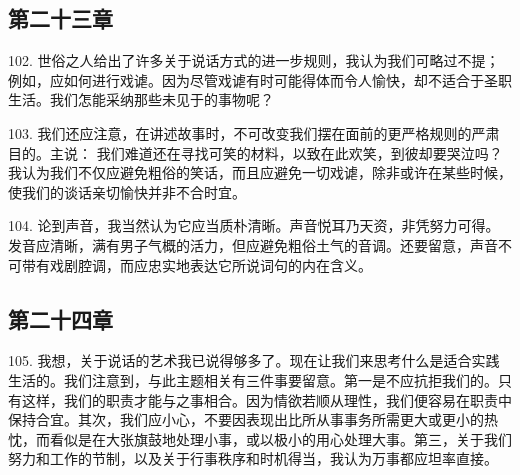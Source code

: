 \subsection{第二十三章}

\par

102. 世俗之人给出了许多关于说话方式的进一步规则，我认为我们可略过不提；例如，应如何进行戏谑。因为尽管戏谑有时可能得体而令人愉快，却不适合于圣职生活。我们怎能采纳那些未见于的事物呢？\par

103. 我们还应注意，在讲述故事时，不可改变我们摆在面前的更严格规则的严肃目的。主说： 我们难道还在寻找可笑的材料，以致在此欢笑，到彼却要哭泣吗？我认为我们不仅应避免粗俗的笑话，而且应避免一切戏谑，除非或许在某些时候，使我们的谈话亲切愉快并非不合时宜。\par

104. 论到声音，我当然认为它应当质朴清晰。声音悦耳乃天资，非凭努力可得。发音应清晰，满有男子气概的活力，但应避免粗俗土气的音调。还要留意，声音不可带有戏剧腔调，而应忠实地表达它所说词句的内在含义。\par


\subsection{第二十四章}

\par

105. 我想，关于说话的艺术我已说得够多了。现在让我们来思考什么是适合实践生活的。我们注意到，与此主题相关有三件事要留意。第一是不应抗拒我们的。只有这样，我们的职责才能与之事相合。因为情欲若顺从理性，我们便容易在职责中保持合宜。其次，我们应小心，不要因表现出比所从事事务所需更大或更小的热忱，而看似是在大张旗鼓地处理小事，或以极小的用心处理大事。第三，关于我们努力和工作的节制，以及关于行事秩序和时机得当，我认为万事都应坦率直接。\par

